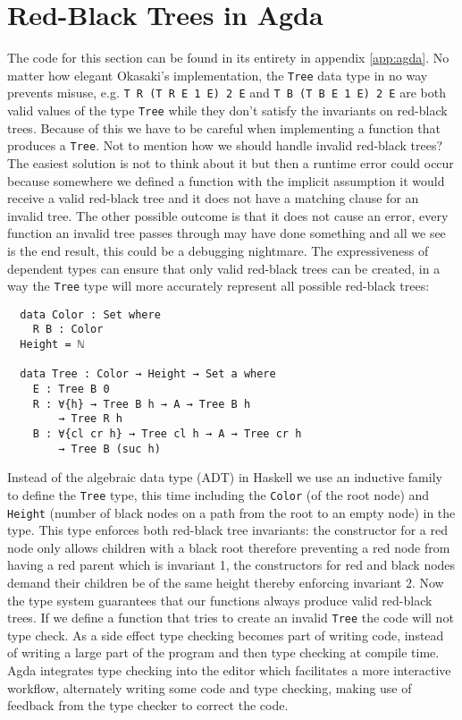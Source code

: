 \documentclass[journal, retainorgcmds]{IEEEtran}
\newcommand{\iagda}[1]{\texttt{#1}}
\newcommand{\ihask}[1]{\texttt{#1}}
\begin{document}
\section{Red-Black Trees in Agda}

The code for this section can be found in its entirety in appendix
\ref{app:agda}.
No matter how elegant Okasaki's implementation, the \ihask{Tree} data type
in no way prevents misuse, e.g. \ihask{T R (T R E 1 E) 2 E} and
\ihask{T B (T B E 1 E) 2 E} are both valid values of the type \ihask{Tree}
while they don't satisfy the invariants on red-black trees.
Because of this we have to be careful when implementing a function that
produces a \ihask{Tree}.
Not to mention how we should handle invalid red-black trees?
The easiest solution is not to think about it but then a runtime error could
occur because somewhere we defined a function with the implicit assumption it
would receive a valid red-black tree and it does not have a matching clause for
an invalid tree.
The other possible outcome is that it does not cause an error, every function
an invalid tree passes through may have done something and all we see is the
end result, this could be a debugging nightmare.
The expressiveness of dependent types can ensure that only valid red-black
trees can be created, in a way the \iagda{Tree} type will more accurately
represent all possible red-black trees:

\begin{verbatim}
  data Color : Set where
    R B : Color
  Height = ℕ

  data Tree : Color → Height → Set a where
    E : Tree B 0
    R : ∀{h} → Tree B h → A → Tree B h
        → Tree R h
    B : ∀{cl cr h} → Tree cl h → A → Tree cr h
        → Tree B (suc h)
\end{verbatim}

Instead of the algebraic data type (ADT) \cite{adt} in Haskell we use an
inductive family \cite{indfam} to define the \iagda{Tree} type, this time
including the \iagda{Color} (of the root node) and \iagda{Height} (number of
black nodes on a path from the root to an empty node) in the type.
This type enforces both red-black tree invariants: the constructor for a
red node only allows children with a black root therefore preventing a red
node from having a red parent which is invariant 1, the constructors for red
and black nodes demand their children be of the same height thereby enforcing
invariant 2.
Now the type system guarantees that our functions always produce valid
red-black trees.
If we define a function that tries to create an invalid \iagda{Tree} the code
will not type check.
As a side effect type checking becomes part of writing code, instead of writing
a large part of the program and then type checking at compile time.
Agda integrates type checking into the editor which facilitates a more
interactive workflow, alternately writing some code and type checking, making
use of feedback from the type checker to correct the code.
\end{document}

